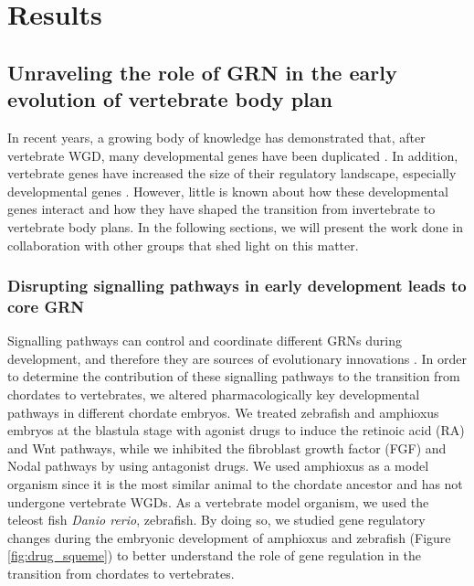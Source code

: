 
\part{Results}
\chapter{Unraveling the role of GRN in the early evolution of vertebrate body plan}
\label{sec:Interconnectivity_chapter}

In recent years, a growing body of knowledge has demonstrated that, after vertebrate WGD, many developmental genes have been duplicated \parencite{dehal_two_2005, putnam_amphioxus_2008}. In addition, vertebrate genes have increased the size of their regulatory landscape, especially developmental genes \parencite{marletaz_amphioxus_2018}. However, little is known about how these developmental genes interact and how they have shaped the transition from invertebrate to vertebrate body plans. In the following sections, we will present the work done in collaboration with other groups \parencite{gil-galvez_gain_2022} that shed light on this matter.


\section{Disrupting signalling pathways in early development leads to core GRN}
\label{sec:Interconnectivity_chatper_sub1}

Signalling pathways can control and coordinate different GRNs during development, and therefore they are sources of evolutionary innovations \parencite{pires-dasilva_evolution_2003}. In order to determine the contribution of these signalling pathways to the transition from chordates to vertebrates, we altered pharmacologically key developmental pathways in different chordate embryos. We treated zebrafish and amphioxus embryos at the blastula stage with agonist drugs to induce the retinoic acid (RA) and Wnt pathways, while we inhibited the fibroblast growth factor (FGF) and Nodal pathways by using antagonist drugs. We used amphioxus as a model organism since it is the most similar animal to the chordate ancestor and has not undergone vertebrate WGDs. As a vertebrate model organism, we used the teleost fish \textit{Danio rerio}, zebrafish. By doing so, we studied gene regulatory changes during the embryonic development of amphioxus and zebrafish (Figure \ref{fig:drug_squeme}) to better understand the role of gene regulation in the transition from chordates to vertebrates.



